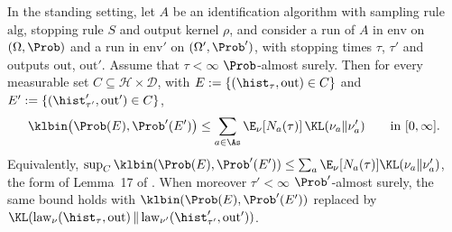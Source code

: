 \begin{theorem}\label{thm:change_of_measure}
\leanok
{}
In the standing setting, let $A$ be an identification algorithm with sampling rule
$\mathrm{alg}$, stopping rule $S$ and output kernel $\rho$, and consider a run of $A$ in
$\mathrm{env}$ on $(\Omega,\Prob)$ and a run in $\mathrm{env}'$ on $(\Omega',\Prob')$, with
stopping times $\tau$, $\tau'$ and outputs $\mathrm{out}$, $\mathrm{out}'$. Assume that
$\tau < \infty$ $\Prob$-almost surely. Then for every measurable set $C \subseteq \mathcal H\times\mathcal D$,
with $E := \{(\hist_\tau, \mathrm{out}) \in C\}$ and $E' := \{(\hist'_{\tau'}, \mathrm{out}') \in C\}$,
\[
  \klbin\big(\Prob(E), \Prob'(E')\big) \le \sum_{a\in\As}\E_\nu[N_a(\tau)]\,\KL(\nu_a\|\nu'_a)
  \qquad\text{in } [0, \infty].
\]
Equivalently, $\sup_C \klbin(\Prob(E), \Prob'(E')) \le \sum_a \E_\nu[N_a(\tau)]\KL(\nu_a\|\nu'_a)$,
the form of Lemma~17 of \cite{essakine2026tight}. When moreover $\tau' < \infty$
$\Prob'$-almost surely, the same bound holds with $\klbin(\Prob(E), \Prob'(E'))$ replaced by
$\KL(\mathrm{law}_\nu(\hist_\tau,\mathrm{out})\,\|\,\mathrm{law}_{\nu'}(\hist'_{\tau'},\mathrm{out}'))$.
\end{theorem}

